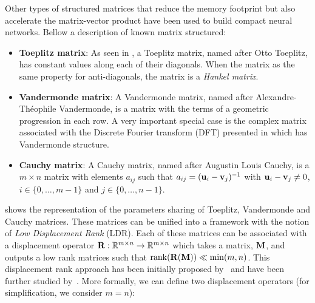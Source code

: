 Other types of structured matrices that reduce the memory footprint but also accelerate the matrix-vector product have been used to build compact neural networks.
Bellow a description of known matrix structured:
\begin{itemize}
  \item \textbf{Toeplitz matrix}: As seen in , a Toeplitz matrix, named after Otto Toeplitz, has constant values along each of their diagonals. When the matrix as the same property for anti-diagonals, the matrix is a \emph{Hankel matrix}.
  \item \textbf{Vandermonde matrix}: A Vandermonde matrix, named after Alexandre-Théophile Vandermonde, is a matrix with the terms of a geometric progression in each row.  
    A very important special case is the complex matrix associated with the Discrete Fourier transform (DFT) presented in  which has Vandermonde structure.
  \item \textbf{Cauchy matrix}: A Cauchy matrix, named after Augustin Louis Cauchy, is a $m \times n$ matrix with elements $a_{ij}$ such that $a_{ij} = (\mathbf{u}_i - \mathbf{v}_j)^{-1}$ with $\mathbf{u}_i - \mathbf{v}_j \neq 0$, $i \in \{0,\dots,m-1\}$ and $j \in \{0,\dots,n-1\}$.
\end{itemize}
 shows the representation of the parameters sharing of Toeplitz, Vandermonde and Cauchy matrices.
These matrices can be unified into a framework with the notion of \emph{Low Displacement Rank} (LDR).
Each of these matrices can be associated with a displacement operator $\mathbf{R}: \mathbb{R}^{m \times n} \rightarrow \mathbb{R}^{m \times n}$ which takes a matrix, $\mathbf{M}$, and outputs a low rank matrices such that $\rank(\mathbf{R}(\mathbf{M})) \ll \min(m,n)$.
This displacement rank approach has been initially proposed by~\citet{kailath1979displacement} and have been further studied by~\citet{kailath1995displacement,pan2001structured}. 
More formally, we can define two displacement operators (for simplification, we consider $m = n$):
